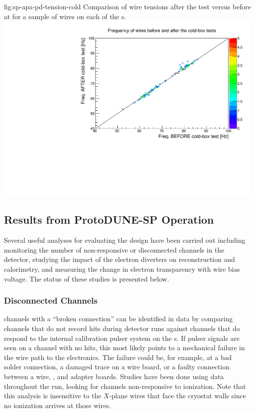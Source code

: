 \begin{dunefigure}{fig:sp-apa-pd-tension-cold}
{Comparison of wire tensions after the \coldbox test versus before at  for a sample of wires on each of the  s.}
\includegraphics[height=0.3\textheight]{graphics/sp-apa-PD-tension-aftercold.pdf} 
\end{dunefigure}

\subsection{Results from ProtoDUNE-SP Operation}
\label{sec:fdsp-apa-qa-protodune-ops}


Several useful analyses for evaluating the  design have been carried out including monitoring the number of non-responsive or disconnected channels in the detector, studying the impact of the electron diverters on reconstruction and calorimetry, and measuring the change in electron transparency with wire bias voltage.  The status of these studies is presented below.   



\subsubsection{Disconnected Channels}
\label{sec:fdsp-apa-qa-protodune-ops-dead-channels}



 channels with a ``broken connection'' can be identified in  data by comparing channels that do not record hits during detector runs against channels that do respond to the internal calibration pulser system on the s.  If pulser signals are seen on a channel with no hits, this most likely points to a mechanical failure in the wire path to the electronics.  The failure could be, for example, at a bad solder connection, a damaged trace on a wire board, or a faulty connection between a wire, , and  adapter boards. Studies have been done using data throughout the  run, looking for channels non-responsive to ionization. Note that this analysis is insensitive to the $X$-plane wires that face the cryostat walls since no ionization arrives at those wires.


